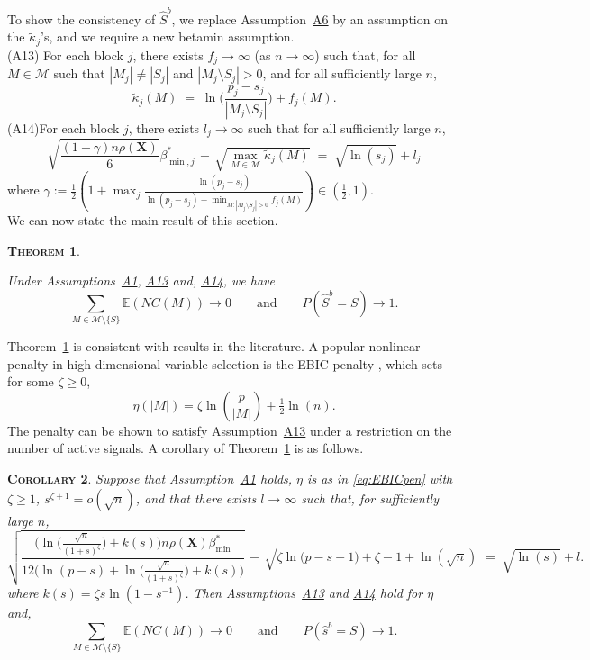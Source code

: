 \documentclass[bj,authoryear]{imsart}
\theoremstyle{plain}
\newtheorem{thm}{\textsc{Theorem}}[section]
\newtheorem{cor}[thm]{\textsc{Corollary}}
\newcommand{\E}{\mathbb{E}}
\newcommand{\M}{\mathcal{M}}
\newcommand{\bs}{\boldsymbol}
\begin{document}
To show the consistency of $\hat S^b$, we replace Assumption~\hyperlink{lab:A6}{A6} by an assumption on the $\tilde{\kappa}_{j}$'s, and we require a new betamin assumption.\\[5pt]
\hypertarget{lab:A13}{(A13)} \quad For each block $j$, there exists $f_j\to \infty$ (as $n\to \infty$) such that, for all $M \in \M$ such that  $|M_j| \neq |S_j|$ and $|M_j \setminus S_j| >0$, and for all sufficiently large $n$,
\begin{equation*}
    \tilde{\kappa}_{j}(M) \;=\;\ln\bigg(\frac{p_j-s_j}{|M_j \setminus S_j| }\bigg) + f_j(M).
\end{equation*}
\hypertarget{lab:A14}{(A14)}\quad For each block $j$, there exists $l_j\to \infty$ such that for all sufficiently large $n$,
    \begin{equation*}
        \sqrt{\frac{(1-\gamma) n\rho(\bs X)}{6}}\beta_{\min,j}^* \,- \,\sqrt{\max_{M\in \M}\tilde{\kappa}_{j}(M)} \;=\; \sqrt{\ln(s_j)} + l_j
    \end{equation*}
where $\gamma:=\frac12(1+\max_j \frac{\ln(p_j-s_j)}{\ln(p_j-s_j) +\min_{M: |M_j\setminus S_j|>0}f_j(M)})\in (\tfrac12,1)$.\\[5pt] 
We can now state the main result of this section.
\begin{thm}\label{theo:suffcondlinearmodelnonlinpen}

Under Assumptions~\hyperlink{lab:A1}{A1}, \hyperlink{lab:A13}{A13} and, \hyperlink{lab:A14}{A14}, we have
$$\sum_{M \in \M\setminus \{S\}}\E\left(NC(M)\right)\to 0 \qquad \mbox{and} \qquad P(\hat{S}^b = S) \to 1.$$
\end{thm}
Theorem~\ref{theo:suffcondlinearmodelnonlinpen} is consistent with results in the literature. A popular nonlinear penalty in high-dimensional variable selection is the EBIC penalty \cite{EBIC}, which sets for some $\zeta\geq 0$,
\begin{equation}\label{eq:EBICpen}
    \eta(|M|)=\zeta\ln{\binom{p}{|M|}} + \tfrac{1}{2}\ln(n).
\end{equation}
The penalty can be shown to satisfy Assumption~\hyperlink{lab:A13}{A13} under a restriction on the number of active signals. A corollary of Theorem~\ref{theo:suffcondlinearmodelnonlinpen} is as follows.
\begin{cor}\label{cor:ebic}
    Suppose that Assumption~\hyperlink{lab:A1}{A1} holds, $\eta$ is as in \eqref{eq:EBICpen} with $\zeta\geq1$, $s^{\zeta+1}=o(\sqrt{n})$, and that there exists $l\to \infty$ such that, for sufficiently large $n$,
    \begin{equation}\label{eq:betaminebic}
        \sqrt{\frac{ \big(\ln \big(\tfrac{\sqrt{n}}{(1+s)^{\zeta}}\big)+ k(s)\big)n\rho(\bs X)\beta_{\min}^*}{12\big(\ln(p-s)+ \ln \big(\tfrac{\sqrt{n}}{(1+s)^{\zeta}}\big)+k(s)\big)}}\,- \,\sqrt{\zeta\ln\big(p-s+1\big)+\zeta-1+\ln(\sqrt{n})} \;=\; \sqrt{\ln(s)} + l .
    \end{equation}
    where $k(s)=\zeta s\ln(1-s^{-1})$. Then Assumptions~\hyperlink{lab:A13}{A13} and \hyperlink{lab:A14}{A14} hold for $\eta$ and, $$\sum_{M \in \M\setminus \{S\}}\E\left(NC(M)\right)\to 0 \qquad \mbox{and} \qquad P(\hat{s}^b = S) \to 1.$$    
\end{cor}
\end{document}
